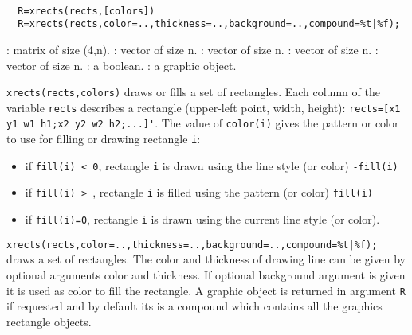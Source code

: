 
\begin{mandesc}
  \\ %
\end{mandesc}
\begin{calling_sequence}
\begin{verbatim}
  R=xrects(rects,[colors])
  R=xrects(rects,color=..,thickness=..,background=..,compound=%t|%f);
\end{verbatim}
\end{calling_sequence}

\begin{parameters}
  \begin{varlist}
    : matrix of size (4,n).
    : vector of size n.
    : vector of size n.
    : vector of size n.
    : vector of size n.
    : a boolean.
    : a graphic object.
  \end{varlist}
\end{parameters}

\begin{mandescription}
  \verb!xrects(rects,colors)! draws or fills a set of rectangles.
  Each column of the variable \verb!rects! describes a rectangle
  (upper-left point, width, height): \verb!rects=[x1 y1 w1 h1;x2 y2 w2 h2;...]'!.
  The value of \verb!color(i)! gives the pattern or color to use for filling or drawing rectangle
  \verb!i!:
  \begin{itemize}
  \item if \verb!fill(i) < 0!, rectangle \verb!i! is drawn using the line style (or
    color) \verb!-fill(i)!
  \item if \verb!fill(i) > !, rectangle \verb!i! is filled using the pattern (or
    color) \verb!fill(i)!
  \item if \verb!fill(i)=0!, rectangle \verb!i! is drawn using the current
    line style (or color).
  \end{itemize}

  \verb!xrects(rects,color=..,thickness=..,background=..,compound=%t|%f);! draws a set of
  rectangles. The color and thickness of drawing line can be given by optional arguments
  color and thickness. If optional background argument is given it is used as color to fill
  the rectangle. A graphic object is returned in argument \verb!R! if requested and by default
  its is a compound which contains all the graphics rectangle objects.

\end{mandescription}


